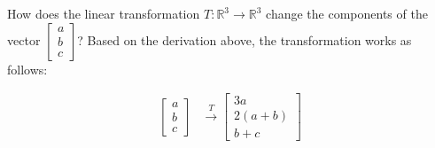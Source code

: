\documentclass[10pt,letterpaper,final]{report}
\begin{document}
How does the linear transformation $T: \mathbb{R}^3 \to \mathbb{R}^3$ change the components of the vector $\begin{bmatrix}a\\b\\c\end{bmatrix}$? Based on the derivation above, the transformation works as follows:

\begin{align*}
  \begin{bmatrix}
    a \\
    b \\
    c
  \end{bmatrix} & \xrightarrow{T} \begin{bmatrix}
                                    3a     \\
                                    2(a+b) \\
                                    b+c
                                  \end{bmatrix}
\end{align*}
\end{document}
